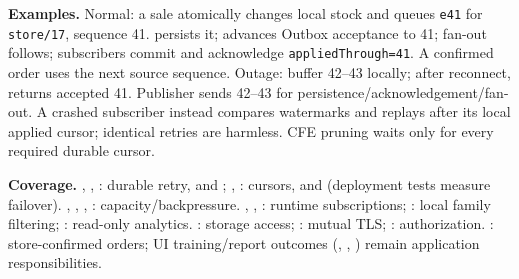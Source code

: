 \textbf{Examples.} Normal: a sale atomically changes local stock and queues
\texttt{e41} for \texttt{store/17}, sequence 41. \opPublish persists it; \opAck
advances Outbox acceptance to 41; fan-out follows; subscribers commit and acknowledge
\texttt{appliedThrough=41}. A confirmed order uses the next source sequence.
Outage: buffer 42--43 locally; after reconnect, \opResync returns accepted 41.
Publisher \opReplay sends 42--43 for persistence/acknowledgement/fan-out. A crashed
subscriber instead compares watermarks and replays after its local applied cursor;
identical retries are harmless. CFE pruning waits only for every required durable cursor.

\begin{sloppypar}
\textbf{Coverage.} , , : durable retry,
\opPublish and \opAck; , : cursors,
\opReplay and \opResync (deployment tests measure failover).
, , , : capacity/backpressure.
, , : runtime subscriptions;
: local family filtering; : read-only analytics.
: storage access; : mutual TLS; : authorization.
: store-confirmed orders; UI training/report outcomes
(, , ) remain application responsibilities.
\end{sloppypar}
\endgroup
